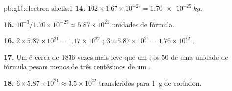 \begin{solution}{pb:g10:electron-shells:1}
\textbf{14.} $102 \times 1.67 \times 10^{-27} = \qty{1.70e-25}{kg}$.

\textbf{15.} $10^{-3} / 1.70 \times 10^{-25} \approx 5.87 \times 10^{21}$
unidades de fórmula.

\textbf{16.} $2 \times 5.87 \times 10^{21} = 1.17 \times 10^{22}$
 ; $3 \times 5.87 \times 10^{21} = 1.76 \times 10^{22}$
 .

\textbf{17.} Um  é cerca de 1836 vezes mais leve que um ;
os 50  de uma unidade de fórmula pesam menos de três centésimos
de um .

\textbf{18.} $6 \times 5.87 \times 10^{21} \approx 3.5 \times 10^{22}$
 transferidos para \qty{1}{g} de coríndon.
\end{solution}
